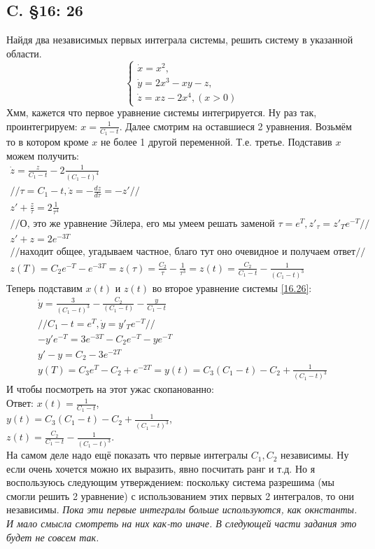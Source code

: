 \documentclass{article}
\begin{document}
\subsection{C. \S16: 26}   
Найдя два независимых первых интеграла системы, решить систему в указанной области.
\begin{equation}\label{16.26}
    \begin{cases}
        \dot x = x^2,\\
        \dot y = 2x^3-xy-z,\\
        \dot z = xz - 2x^4, (x>0)
    \end{cases}
\end{equation}
Хмм, кажется что первое уравнение системы интегрируется. Ну раз так, проинтегрируем: $x=\frac{1}{C_1-t}$. Далее смотрим на оставшиеся 2 уравнения. Возьмём то в котором кроме $x$ не более 1 другой переменной. Т.е. третье. Подставив $x$ можем получить:
\begin{gather*}
    \dot z = \frac{z}{C_1-t} -2 \frac{1}{(C_1-t)^4}\\
    // \tau = C_1-t, \dot z = -\frac{dz}{d \tau}=-z'  // \\
    z'+\frac{z}{\tau}=2 \frac{1}{\tau^4}\\
    // \text{О, это же уравнение Эйлера, его мы умеем решать заменой } \tau=e^T, z'_\tau=z'_T e^{-T}// \\
    z'+z=2e^{-3T}\\
    //\text{находит общее, угадываем частное, благо тут оно очевидное и получаем ответ}// \\
    z(T)=C_2 e^{-T}-e^{-3T}=z(\tau)=\frac{C_2}{\tau}-\frac{1}{\tau^3}=z(t)=\frac{C_2}{C_1-t}-\frac{1}{(C_1-t)^3}
\end{gather*}
Теперь подставим $x(t)$ и $z(t)$ во второе уравнение системы \ref{16.26}:
\begin{gather*}
    \dot y = \frac{3}{(C_1-t)^3}-\frac{C_2}{(C_1-t)}-\frac{y}{C_1-t}\\
    //C_1-t=e^{T}, \dot y = y'_T e^{-T}//\\
    -y' e^{-T} = 3e^{-3T}-C_2 e^{-T}-y e^{-T}\\
    y'-y=C_2-3e^{-2T}\\
    y(T)=C_3 e^T-C_2+e^{-2 T}=y(t)=C_3(C_1-t)-C_2+\frac{1}{(C_1-t)^3}
\end{gather*}
И чтобы посмотреть на этот ужас скопанованно:\\
Ответ: $x(t)=\frac{1}{C_1-t}$,\\
        $y(t)=C_3(C_1-t)-C_2+\frac{1}{(C_1-t)^3}$,\\
        $z(t)=\frac{C_2}{C_1-t}-\frac{1}{(C_1-t)^3}$.\\
На самом деле надо ещё показать что первые интегралы $C_1,C_2$ независимы. Ну если очень хочется можно их выразить, явно посчитать ранг и т.д. Но я воспользуюсь следующим утверждением: поскольку система разрешима (мы смогли решить 2 уравнение) с использованием этих первых 2 интегралов, то они независимы.
 \textcolor[rgb]{0.480469,0.566406,0.480469}{\textit{Пока эти первые интегралы больше используются, как окнстанты. И мало смысла смотреть на них как-то иначе. В следующей части задания это будет не совсем так.}}                                               
\end{document}
